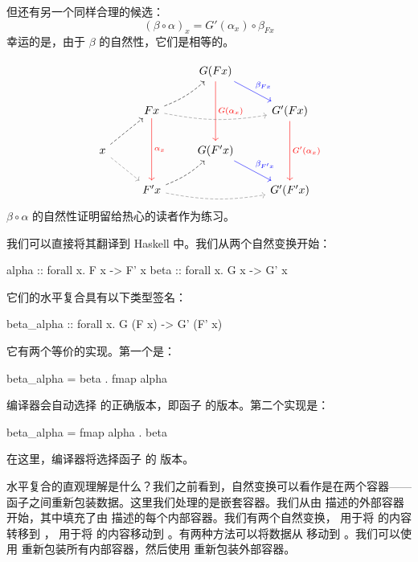 \documentclass[DaoFP]{subfiles}
\begin{document}
但还有另一个同样合理的候选：
\[ (\beta \circ \alpha)_x = G'(\alpha_x) \circ \beta_{F x}\]
幸运的是，由于 $\beta$ 的自然性，它们是相等的。

\[
 \begin{tikzcd}
  && G(F x)
  \arrow[dd, red, "G(\alpha_x)"]
  \arrow[dr, blue, "\beta_{F x}"]
  \\
  & F x
  \arrow[rr, bend right=10, dashed, gray]
  \arrow[ur, bend right=10, dashed]
  \arrow[dd, red, "\alpha_x"]
 && G' (F x)
  \arrow[dd, red, "G'(\alpha_x)"]
 \\
 x
 \arrow[ur, dashed]
 \arrow[dr, gray, dashed]
 && G(F' x)
  \arrow[dr, blue, "\beta_{F' x}"]
 \\
 &F' x
  \arrow[rr, bend right=10, dashed, gray]
 \arrow[ur, bend right=10, dashed]
 && G'(F' x)
\end{tikzcd}
\]
$\beta \circ \alpha$ 的自然性证明留给热心的读者作为练习。

我们可以直接将其翻译到 Haskell 中。我们从两个自然变换开始：
\begin{haskell}
alpha :: forall x. F x -> F' x
beta  :: forall x. G x -> G' x
\end{haskell}
它们的水平复合具有以下类型签名：
\begin{haskell}
beta_alpha :: forall x. G (F x) -> G' (F' x)
\end{haskell}
它有两个等价的实现。第一个是：
\begin{haskell}
beta_alpha = beta . fmap alpha
\end{haskell}
编译器会自动选择  的正确版本，即函子  的版本。第二个实现是：
\begin{haskell}
beta_alpha = fmap alpha . beta
\end{haskell}
在这里，编译器将选择函子  的  版本。

水平复合的直观理解是什么？我们之前看到，自然变换可以看作是在两个容器——函子之间重新包装数据。这里我们处理的是嵌套容器。我们从由  描述的外部容器开始，其中填充了由  描述的每个内部容器。我们有两个自然变换， 用于将  的内容转移到 ， 用于将  的内容移动到 。有两种方法可以将数据从  移动到 。我们可以使用  重新包装所有内部容器，然后使用  重新包装外部容器。
\end{document}
